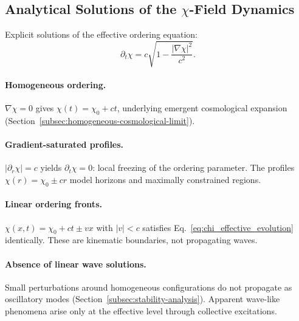 \subsection{Analytical Solutions of the \texorpdfstring{$\chi$}{χ}-Field Dynamics}
  \label{subsec:analytical-solutions}

  Explicit solutions of the effective ordering equation:
  \begin{equation}
    \partial_t\chi
    = c\sqrt{1 - \frac{|\nabla\chi|^2}{c^2}}.
    \label{eq:chi_effective_evolution}
  \end{equation}

  \paragraph{Homogeneous ordering.}
    $\nabla\chi = 0$ gives $\chi(t) = \chi_0 + ct$, underlying emergent
    cosmological expansion
    (Section~\ref{subsec:homogeneous-cosmological-limit}).

  \paragraph{Gradient-saturated profiles.}
    $|\partial_r\chi| = c$ yields $\partial_t\chi = 0$: local freezing
    of the ordering parameter.
    The profiles $\chi(r) = \chi_0 \pm cr$ model horizons and maximally
    constrained regions.

  \paragraph{Linear ordering fronts.}
    $\chi(x,t) = \chi_0 + ct \pm vx$ with $|v| < c$ satisfies
    Eq.~\eqref{eq:chi_effective_evolution} identically.
    These are kinematic boundaries, not propagating waves.

  \paragraph{Absence of linear wave solutions.}
    Small perturbations around homogeneous configurations do not propagate
    as oscillatory modes
    (Section~\ref{subsec:stability-analysis}).
    Apparent wave-like phenomena arise only at the effective level through
    collective excitations.
